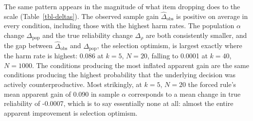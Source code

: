 \documentclass[
  nonatbib,
  authoryear,
  preprint]{elsarticle}
\begin{document}
The same pattern appears in the magnitude of what item dropping does to
the scale (Table~\ref{tbl-deltas}). The observed sample gain
\(\widehat{\Delta}_{\text{obs}}\) is positive on average in every
condition, including those with the highest harm rates. The population
\(\alpha\) change \(\Delta_{\text{pop}}\) and the true reliability
change \(\Delta_{\rho}\) are both consistently smaller, and the gap
between \(\widehat{\Delta}_{\text{obs}}\) and \(\Delta_{\text{pop}}\),
the selection optimism, is largest exactly where the harm rate is
highest: 0.086 at \(k = 5\), \(N = 20\), falling to 0.0001 at
\(k = 40\), \(N = 1000\). The conditions producing the most inflated
apparent gain are the same conditions producing the highest probability
that the underlying decision was actively counterproductive. Most
strikingly, at \(k = 5\), \(N = 20\) the forced rule's mean apparent
gain of 0.090 in sample \(\alpha\) corresponds to a mean change in true
reliability of -0.0007, which is to say essentially none at all: almost
the entire apparent improvement is selection optimism.

\clearpage

\begingroup\fontsize{8}{10}\selectfont
\end{document}
